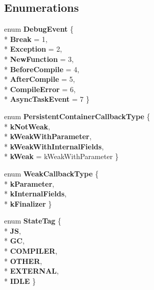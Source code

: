 \subsection*{Enumerations}
\begin{DoxyCompactItemize}
\item 
enum {\bfseries Debug\+Event} \{ \\*
{\bfseries Break} = 1, 
\\*
{\bfseries Exception} = 2, 
\\*
{\bfseries New\+Function} = 3, 
\\*
{\bfseries Before\+Compile} = 4, 
\\*
{\bfseries After\+Compile} = 5, 
\\*
{\bfseries Compile\+Error} = 6, 
\\*
{\bfseries Async\+Task\+Event} = 7
 \}\hypertarget{namespacev8_a4157e857c3767e2b82686a53ae3da853}{}\label{namespacev8_a4157e857c3767e2b82686a53ae3da853}

\item 
enum {\bfseries Persistent\+Container\+Callback\+Type} \{ \\*
{\bfseries k\+Not\+Weak}, 
\\*
{\bfseries k\+Weak\+With\+Parameter}, 
\\*
{\bfseries k\+Weak\+With\+Internal\+Fields}, 
\\*
{\bfseries k\+Weak} = k\+Weak\+With\+Parameter
 \}\hypertarget{namespacev8_ad2a33b8f8a1701a800a691dd025f7dde}{}\label{namespacev8_ad2a33b8f8a1701a800a691dd025f7dde}

\item 
enum {\bfseries Weak\+Callback\+Type} \{ \\*
{\bfseries k\+Parameter}, 
\\*
{\bfseries k\+Internal\+Fields}, 
\\*
{\bfseries k\+Finalizer}
 \}\hypertarget{namespacev8_a68b2b90003e18980bc0b438c95be1005}{}\label{namespacev8_a68b2b90003e18980bc0b438c95be1005}

\item 
enum {\bfseries State\+Tag} \{ \\*
{\bfseries JS}, 
\\*
{\bfseries GC}, 
\\*
{\bfseries C\+O\+M\+P\+I\+L\+ER}, 
\\*
{\bfseries O\+T\+H\+ER}, 
\\*
{\bfseries E\+X\+T\+E\+R\+N\+AL}, 
\\*
{\bfseries I\+D\+LE}
 \}\hypertarget{namespacev8_adb1bd0f9ef7cc084b6a94a5e1b420f69}{}\label{namespacev8_adb1bd0f9ef7cc084b6a94a5e1b420f69}


\end{DoxyCompactItemize}
